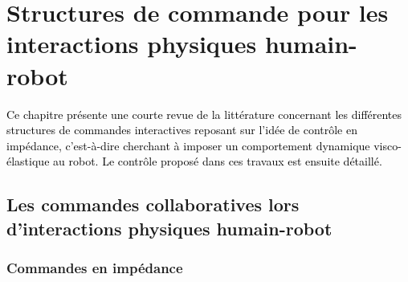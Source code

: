\chapter{Structures de commande pour les interactions physiques humain-robot} \label{chap2}%
\minitoc

\textcolor{black}{Ce chapitre présente une courte revue de la littérature concernant les différentes structures de commandes interactives reposant sur l'idée de contrôle en impédance, c'est-à-dire cherchant à imposer un comportement dynamique visco-élastique au robot. Le contrôle proposé dans ces travaux est ensuite détaillé.}

\section[Les commandes collaboratives]{Les commandes collaboratives lors d'interactions physiques humain-robot} \label{chap2_sec_cmd_collab}

%
%
%
%

\subsection{Commandes en impédance} \label{chap2_sec_cmd_collab_subsec_cmd_imp}

